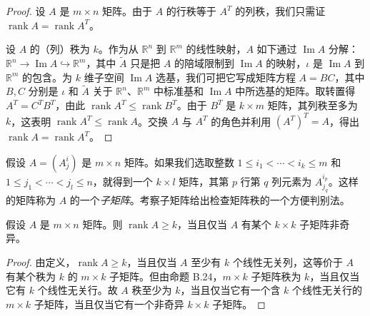 \documentclass[../../main.tex]{subfiles}
\begin{document}
\begin{proof}
设 $A$ 是 $m\times n$ 矩阵。由于 $A$ 的行秩等于 $A^T$ 的列秩，我们只需证 $\operatorname{rank}A=\operatorname{rank}A^T$。

设 $A$ 的（列）秩为 $k$。作为从 $\mathbb R^n$ 到 $\mathbb R^m$ 的线性映射，$A$ 如下通过 $\operatorname{Im}A$ 分解：$\mathbb R^n\to\operatorname{Im}A\hookrightarrow\mathbb R^m$，其中 $\widetilde A$ 只是把 $A$ 的陪域限制到 $\operatorname{Im}A$ 的映射，$\iota$ 是 $\operatorname{Im}A$ 到 $\mathbb R^m$ 的包含。为 $k$ 维子空间 $\operatorname{Im}A$ 选基，我们可把它写成矩阵方程 $A=BC$，其中 $B,C$ 分别是 $\iota$ 和 $\widetilde A$ 关于 $\mathbb R^n$、$\mathbb R^m$ 中标准基和 $\operatorname{Im}A$ 中所选基的矩阵。取转置得 $A^T=C^TB^T$，由此 $\operatorname{rank}A^T\leqslant\operatorname{rank}B^T$。由于 $B^T$ 是 $k\times m$ 矩阵，其列秩至多为 $k$，这表明 $\operatorname{rank}A^T\leqslant\operatorname{rank}A$。交换 $A$ 与 $A^T$ 的角色并利用 $(A^T)^T=A$，得出 $\operatorname{rank}A=\operatorname{rank}A^T$。
\end{proof}

假设 $A=(A^i_j)$ 是 $m\times n$ 矩阵。如果我们选取整数 $1\leqslant i_1<\cdots<i_k\leqslant m$ 和 $1\leqslant j_1<\cdots<j_l\leqslant n$，就得到一个 $k\times l$ 矩阵，其第 $p$ 行第 $q$ 列元素为 $A^{i_p}_{j_q}$。这样的矩阵称为 $A$ 的一个\emph{子矩阵}。考察子矩阵给出检查矩阵秩的一个方便判别法。

\begin{proposition}\label{proposition:appB-submatrix-rank}
假设 $A$ 是 $m\times n$ 矩阵。则 $\operatorname{rank}A\geqslant k$，当且仅当 $A$ 有某个 $k\times k$ 子矩阵非奇异。
\end{proposition}

\begin{proof}
由定义，$\operatorname{rank}A\geqslant k$，当且仅当 $A$ 至少有 $k$ 个线性无关列，这等价于 $A$ 有某个秩为 $k$ 的 $m\times k$ 子矩阵。但由命题 B.24，$m\times k$ 子矩阵秩为 $k$，当且仅当它有 $k$ 个线性无关行。故 $A$ 秩至少为 $k$，当且仅当它有一个含 $k$ 个线性无关行的 $m\times k$ 子矩阵，当且仅当它有一个非奇异 $k\times k$ 子矩阵。
\end{proof}
\end{document}
